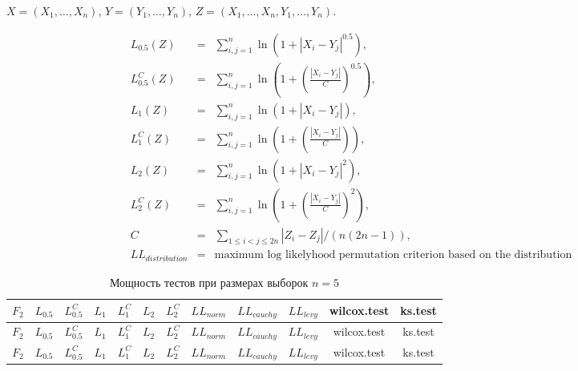 \documentclass{article}
\begin{document}
$X=(X_1,\ldots,X_n)$, $Y=(Y_1,\ldots,Y_n)$, $Z=(X_1,\ldots,X_n,Y_1,\ldots,Y_n)$.

\begin{eqnarray}
  \label{L0.5}
  L_{0.5}(Z)&=&\sum_{i,j=1}^{n}{\ln(1+|X_{i}-Y_{j}|^{0.5})},\\
  \label{L0.5C}
  L_{0.5}^C(Z)&=&\sum_{i,j=1}^{n}{\ln\left(1+\left(\frac{|X_{i}-Y_{j}|}{C}\right)^{0.5}\right)},\\
  \label{L1}
  L_1(Z)&=&\sum_{i,j=1}^{n}{\ln(1+|X_{i}-Y_{j}|)},\\
  \label{L1C}
  L_1^C(Z)&=&\sum_{i,j=1}^{n}{\ln\left(1+\left(\frac{|X_{i}-Y_{j}|}{C}\right)\right)},\\
  \label{L2}
  L_2(Z)&=&\sum_{i,j=1}^{n}{\ln(1+|X_{i}-Y_{j}|^2)},\\
  \label{L2C}
  L_2^C(Z)&=&\sum_{i,j=1}^{n}{\ln\left(1+\left(\frac{|X_{i}-Y_{j}|}{C}\right)^2\right)},\\
  \label{C}
  C&=&\sum_{1\le i<j\le 2n}{|Z_{i}-Z_{j}|}/(n(2n-1)),\\
  \label{LL}
  LL_{distribution} &=& \text{maximum log likelyhood permutation criterion based on the distribution}
\end{eqnarray}

\begin{longtable}{|c|c|c|c|c|c|c|c|c|c|c|c|}
  \caption{Мощность тестов при размерах выборок $n=5$}
  \label{table:n5} \\
  \hline
  $F_2$ & $L_{0.5}$ & $L_{0.5}^C$ & $L_{1}$ & $L_{1}^C$ & $L_{2}$ & $L_{2}^C$ & $LL_{norm}$ & $LL_{cauchy}$ & $LL_{levy}$ & wilcox.test & ks.test \\ \hline
  
  
  
  
  $F_2$ & $L_{0.5}$ & $L_{0.5}^C$ & $L_{1}$ & $L_{1}^C$ & $L_{2}$ & $L_{2}^C$ & $LL_{norm}$ & $LL_{cauchy}$ & $LL_{levy}$ & wilcox.test & ks.test \\ \hline
  
  
  
  
  $F_2$ & $L_{0.5}$ & $L_{0.5}^C$ & $L_{1}$ & $L_{1}^C$ & $L_{2}$ & $L_{2}^C$ & $LL_{norm}$ & $LL_{cauchy}$ & $LL_{levy}$ & wilcox.test & ks.test \\ \hline
  
  
  
  
\end{longtable}
\end{document}

